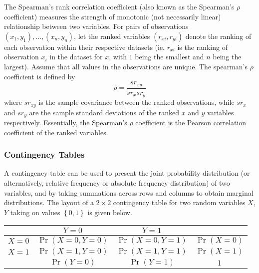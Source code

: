 \documentclass[11pt]{report} %
\begin{document}
The Spearman's rank correlation coefficient (also known as the Spearman's $\rho$ coefficient) measures the strength of monotonic (not necessarily linear) relationship between two variables. For pairs of observations $\left(x_{1}, y_{1}\right), \dots, \left(x_{n}, y_{n}\right)$, let the ranked variables $\left(r_{xi}, r_{yi}\right)$ denote the ranking of each observation within their respective datasets (ie. $r_{xi}$ is the ranking of observation $x_{i}$ in the dataset for $x$, with $1$ being the smallest and $n$ being the largest). Assume that all values in the observations are unique. The spearman's $\rho$ coefficient is defined by
\begin{equation}
\rho = \dfrac{sr_{xy}}{sr_{x}sr_{y}}
\end{equation}
where $sr_{xy}$ is the sample covariance between the ranked observations, while $sr_{x}$ and $sr_{y}$ are the sample standard deviations of the ranked $x$ and $y$ variables respectively. Essentially, the Spearman's $\rho$ coefficient is the Pearson correlation coefficient of the ranked variables.

\subsubsection{Contingency Tables}

A contingency table can be used to present the joint probability distribution (or alternatively, relative frequency or absolute frequency distribution) of two variables, and by taking summations across rows and columns to obtain marginal distributions. The layout of a $2\times 2$ contingency table for two random variables $X$, $Y$ taking on values $\left\{0, 1\right\}$ is given below.
\begin{table}[H]\centering
\begin{tabular}{|c||c|c|c|}
\hline 
 & $Y = 0$ & $Y = 1$ & \\
\hline 
\hline 
$X = 0$ & $\operatorname{Pr}\left(X = 0, Y = 0\right)$ &  $\operatorname{Pr}\left(X = 0, Y = 1\right)$ & $\operatorname{Pr}\left(X = 0\right)$ \\
\hline 
$X = 1$ & $\operatorname{Pr}\left(X = 1, Y = 0\right)$ & $\operatorname{Pr}\left(X = 1, Y = 1\right)$ & $\operatorname{Pr}\left(X = 1\right)$ \\
\hline 
 & $\operatorname{Pr}\left(Y = 0\right)$ & $\operatorname{Pr}\left(Y = 1\right)$ & $1$ \\
 \hline
\end{tabular}
\end{table}
\end{document}

